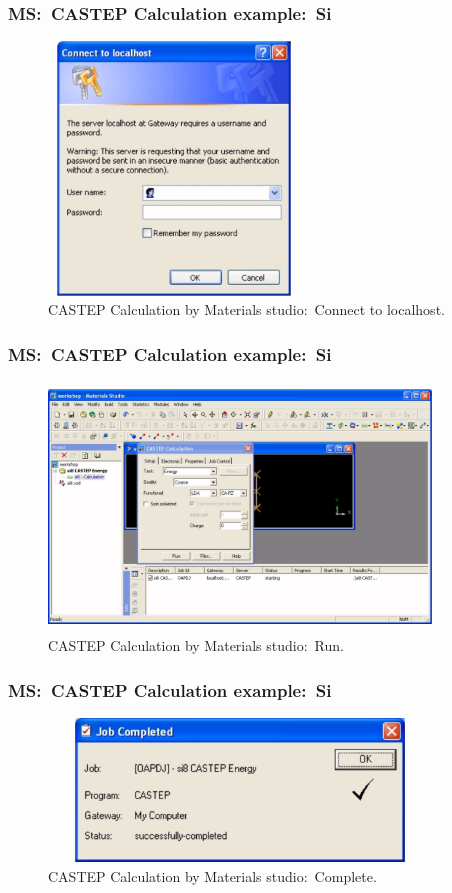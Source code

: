 \frame
{
	\frametitle{\textrm{MS:~CASTEP Calculation example:~Si}}
\begin{figure}[h!]
\centering
\vspace*{-0.10in}
\includegraphics[height=2.65in,width=2.63in,viewport=0 0 643 698,clip]{Figures/MS-CASTEP-04-Si-sever.png}
\caption{\tiny \textrm{CASTEP Calculation by Materials studio:~Connect to localhost.}}%
\label{MS-CASTEP-Calculation-sever}
\end{figure}
}

\frame
{
	\frametitle{\textrm{MS:~CASTEP Calculation example:~Si}}
\begin{figure}[h!]
\centering
\vspace*{-0.10in}
\includegraphics[height=2.60in,width=4.00in,viewport=0 0 1210 740,clip]{Figures/MS-CASTEP-05-Si-Calculat.png}
\caption{\tiny \textrm{CASTEP Calculation by Materials studio:~Run.}}%
\label{MS-CASTEP-Calculation-Run}
\end{figure}
}

\frame
{
	\frametitle{\textrm{MS:~CASTEP Calculation example:~Si}}
\begin{figure}[h!]
\centering
\includegraphics[height=1.50in,width=4.00in,viewport=0 0 1070 469,clip]{Figures/MS-CASTEP-06-Si-Calculat-finish.png}
\caption{\tiny \textrm{CASTEP Calculation by Materials studio:~Complete.}}%
\label{MS-CASTEP-Calculation-Complete}
\end{figure}
}


